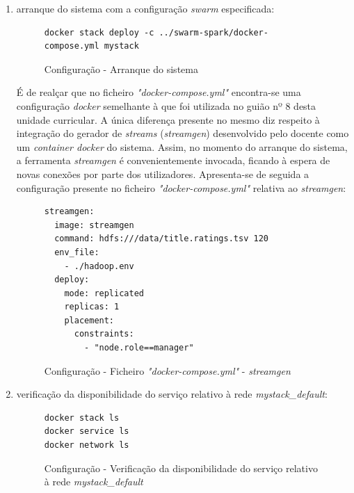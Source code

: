 \documentclass[a4paper]{report}
\begin{document}
{\begin{enumerate}[label=\textbf{\arabic*.}]
            \item arranque do sistema com a configuração \textit{swarm} especificada:
            \begin{figure}[H]
                \centering
                \begin{verbatim}
docker stack deploy -c ../swarm-spark/docker-compose.yml mystack
                \end{verbatim}
                \vspace{-5mm}
                \caption{Configuração - Arranque do sistema}
                \label{fig:9}
            \end{figure}

            É de realçar que no ficheiro \textit{"docker-compose.yml"} encontra-se uma configuração \textit{docker} semelhante à que foi utilizada no guião nº 8 desta unidade curricular.
            A única diferença presente no mesmo diz respeito à integração do gerador de \textit{streams} (\textit{streamgen}) desenvolvido pelo docente como um \textit{container docker} do sistema.
            Assim, no momento do arranque do sistema, a ferramenta \textit{streamgen} é convenientemente invocada, ficando à espera de novas conexões por parte dos utilizadores.
            Apresenta-se de seguida a configuração presente no ficheiro \textit{"docker-compose.yml"} relativa ao \textit{streamgen}:

            \begin{figure}[H]
                \centering
                \begin{verbatim}
streamgen:
  image: streamgen
  command: hdfs:///data/title.ratings.tsv 120
  env_file:
    - ./hadoop.env
  deploy:
    mode: replicated
    replicas: 1
    placement:
      constraints:
        - "node.role==manager"
                \end{verbatim}
                \vspace{-5mm}
                \caption{Configuração - Ficheiro \textit{"docker-compose.yml"} - \textit{streamgen}}
                \label{fig:10}
            \end{figure}

            \item verificação da disponibilidade do serviço relativo à rede \textit{mystack\_default}:
            \begin{figure}[H]
                \centering
                \begin{verbatim}
docker stack ls
docker service ls
docker network ls
                \end{verbatim}
                \vspace{-5mm}
                \caption{Configuração - Verificação da disponibilidade do serviço relativo à rede \textit{mystack\_default}}
                \label{fig:11}
            \end{figure}


\end{enumerate}}
\end{document}
